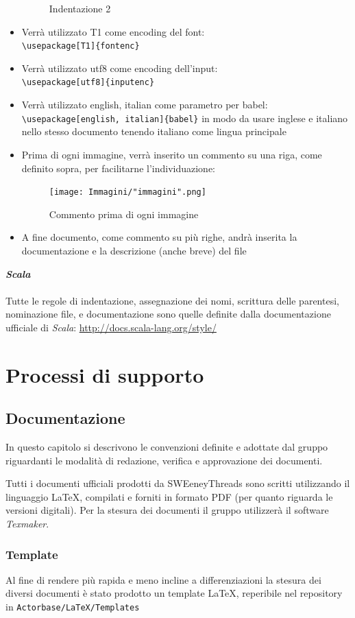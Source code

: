 \documentclass[a4paper]{report}
\newcommand{\mychapter}[2]{
	\setcounter{chapter}{#1}
	\setcounter{section}{0}
	\setcounter{subsection}{1}
	\chapter*{#2}
	\addcontentsline{toc}{chapter}{#2}
}
\begin{document}
\begin{itemize}
\begin{figure}[h!]
			\caption{Indentazione 2}
		\end{figure}
		\item Verrà utilizzato T1 come encoding del font: \\ \verb|\usepackage[T1]{fontenc}|
		\item Verrà utilizzato utf8 come encoding dell'input: \\ \verb|\usepackage[utf8]{inputenc}|
		\item Verrà utilizzato english, italian come parametro per babel: \\ 
		\verb|\usepackage[english, italian]{babel}| in modo da usare inglese e italiano nello 
		stesso documento tenendo italiano come lingua principale
		\item Prima di ogni immagine, verrà inserito un commento su una riga, come definito 
		sopra, per facilitarne l'individuazione:
		\begin{figure}[h!]
			\centering
			\texttt{[image: Immagini/"immagini".png]}
			\caption{Commento prima di ogni immagine}
		\end{figure}
		\item A fine documento, come commento su più righe, andrà inserita la documentazione e la descrizione (anche breve) del file
	\end{itemize}
	\textbf{\emph{Scala}} \\ \\ 
	Tutte le regole di indentazione, assegnazione dei nomi, scrittura delle parentesi, nominazione file, e documentazione sono quelle
	definite dalla documentazione ufficiale di \emph{Scala}: \url{http://docs.scala-lang.org/style/}
	\mychapter{3}{Processi di supporto}
	\section{Documentazione} 
	In questo capitolo si descrivono le convenzioni definite e adottate dal gruppo riguardanti le 
	modalità di redazione, verifica e approvazione dei documenti.
	
	Tutti i documenti ufficiali prodotti da SWEeneyThreads sono scritti utilizzando il linguaggio \LaTeX, 
	compilati e forniti in formato PDF (per quanto riguarda le versioni digitali). Per la stesura dei 
	documenti il gruppo utilizzerà il software \emph{Texmaker}.
	\subsection{Template}
	Al fine di rendere più rapida e meno incline a differenziazioni la stesura dei diversi documenti è stato prodotto un
	template \LaTeX, reperibile nel repository in \verb|Actorbase/LaTeX/Templates|
\end{document}
